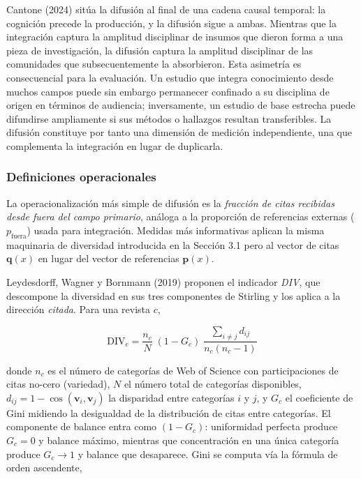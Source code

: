 \documentclass[
]{article}
\begin{document}
Cantone (2024) sitúa la difusión al final de una cadena causal temporal:
la cognición precede la producción, y la difusión sigue a ambas.
Mientras que la integración captura la amplitud disciplinar de insumos
que dieron forma a una pieza de investigación, la difusión captura la
amplitud disciplinar de las comunidades que subsecuentemente la
absorbieron. Esta asimetría es consecuencial para la evaluación. Un
estudio que integra conocimiento desde muchos campos puede sin embargo
permanecer confinado a su disciplina de origen en términos de audiencia;
inversamente, un estudio de base estrecha puede difundirse ampliamente
si sus métodos o hallazgos resultan transferibles. La difusión
constituye por tanto una dimensión de medición independiente, una que
complementa la integración en lugar de duplicarla.

\hypertarget{definiciones-operacionales}{%
\subsubsection{Definiciones
operacionales}\label{definiciones-operacionales}}

La operacionalización más simple de difusión es la \emph{fracción de
citas recibidas desde fuera del campo primario}, análoga a la proporción
de referencias externas (\(p_{\text{fuera}}\)) usada para integración.
Medidas más informativas aplican la misma maquinaria de diversidad
introducida en la Sección 3.1 pero al vector de citas \(\mathbf{q}(x)\)
en lugar del vector de referencias \(\mathbf{p}(x)\).

Leydesdorff, Wagner y Bornmann (2019) proponen el indicador \emph{DIV},
que descompone la diversidad en sus tres componentes de Stirling y los
aplica a la dirección \emph{citada}. Para una revista \(c\),

\[\text{DIV}_c = \frac{n_c}{N}\;(1 - G_c)\;
  \frac{\displaystyle\sum_{i \neq j} d_{ij}}{n_c(n_c - 1)}\]

donde \(n_c\) es el número de categorías de Web of Science con
participaciones de citas no-cero (variedad), \(N\) el número total de
categorías disponibles,
\(d_{ij} = 1 - \cos(\mathbf{v}_i, \mathbf{v}_j)\) la disparidad entre
categorías \(i\) y \(j\), y \(G_c\) el coeficiente de Gini midiendo la
desigualdad de la distribución de citas entre categorías. El componente
de balance entra como \((1 - G_c)\): uniformidad perfecta produce
\(G_c = 0\) y balance máximo, mientras que concentración en una única
categoría produce \(G_c \to 1\) y balance que desaparece. Gini se
computa vía la fórmula de orden ascendente,
\end{document}
